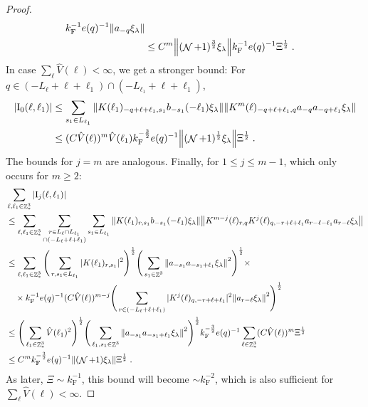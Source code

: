 \documentclass[12pt,a4paper]{article}
\numberwithin{equation}{section}
\newcommand{\1}{\mathbb{I}}
\newcommand{\F}{\mathrm{F}}
\newcommand{\I}{\mathrm{I}}
\DeclareMathOperator{\Z}{\mathbb{Z}}
\DeclareMathOperator{\NN}{\mathcal{N}}
\newcommand{\half}{\frac{1}{2}}
\theoremstyle{plain}
\theoremstyle{definition}
\theoremstyle{remark}
\theoremstyle{plain}
\theoremstyle{definition}
\theoremstyle{remark}
\begin{document}
\begin{proof}
{\begin{align}
		k_{\F}^{-1} e(q)^{-1}
		\norm{a_{-q} \xi_\lambda } \nonumber\\
	&\leq C^m \norm{(\NN+1)^{\frac 32} \xi_\lambda}
		k_{\F}^{-1} e(q)^{-1} \Xi^\half \;. \label{eq:estEQ2171_Coulomb}
\end{align}
In case $ \sum_\ell \hat{V}(\ell) < \infty $, we get a stronger bound: For $ q \in (-L_\ell + \ell + \ell_1) \cap (-L_{\ell_1} + \ell + \ell_1) $,}
\begin{align}
	|\I_0(\ell, \ell_1)|
	&\leq \sum\limits_{s_1 \in L_{\ell_1}}
		\norm{K(\ell_1)_{-q+\ell+\ell_1,s_1} b_{-s_1}(-\ell_1) \xi_\lambda}
		\norm{ K^m(\ell)_{-q+\ell+\ell_1,q}a_{-q}a_{-q+\ell_1} \xi_\lambda } \nonumber\\
	&\leq (C \hat{V}(\ell))^m
		\hat{V}(\ell_1)
		k_{\F}^{-\frac 32} e(q)^{-1}
		\norm{(\NN+1)^\half\xi_\lambda} \Xi^\half \;. \label{eq:estEQ2171}
\end{align}
The bounds for $ j = m $ are analogous. Finally, for $ 1 \le j \le m-1 $, which only occurs for $ m \ge 2 $:
\textcolor{green!30!black}{
\begin{align}
	&\sum_{\ell,\ell_1 \in \Z^3_*} |\I_j(\ell, \ell_1)| \nonumber\\
	&\leq \sum_{\ell,\ell_1 \in \Z^3_*} \sum\limits_{\substack{r\in L_{\ell} \cap L_{\ell_1} \\ \cap (-L_{\ell}+\ell+\ell_1)}} 
		\sum\limits_{s_1\in L_{\ell_1}} \norm{K(\ell_1)_{r,s_1} b_{-s_1}(-\ell_1) \xi_\lambda}\norm{ K^{m-j}(\ell)_{r,q} K^j(\ell)_{q,-r+\ell+\ell_1} a_{r-\ell-\ell_1} a_{r-\ell} \xi_\lambda } \nonumber\\
	&\leq \sum_{\ell,\ell_1 \in \Z^3_*} \Bigg( \sum\limits_{r,s_1\in L_{\ell_1}} 
		|K(\ell_1)_{r,s_1}|^2 \Bigg)^{\half}
		\Bigg( \sum\limits_{s_1 \in \Z^3}
		\norm{a_{-s_1} a_{-s_1+\ell_1} \xi_\lambda}^2 \Bigg)^{\half} \times \nonumber\\
		&\quad \times k_{\F}^{-1} e(q)^{-1} (C \hat{V}(\ell))^{m-j}
		\Bigg( \sum\limits_{r\in (-L_{\ell}+\ell+\ell_1)} 
		|K^j(\ell)_{q,-r+\ell+\ell_1}|^2
		\norm{ a_{r-\ell} \xi_\lambda }^2 \Bigg)^{\half} \nonumber\\
	&\leq  \Bigg( \sum_{\ell_1 \in \Z^3_*} 
		\hat{V}(\ell_1)^2 \Bigg)^{\half}
		\Bigg( \sum\limits_{\ell_1,s_1 \in \Z^3}
		\norm{a_{-s_1} a_{-s_1+\ell_1} \xi_\lambda}^2 \Bigg)^{\half}
		k_{\F}^{-\frac 32} e(q)^{-1} \sum_{\ell \in \Z^3_*} (C \hat{V}(\ell))^m \Xi^\half \nonumber\\
	&\leq C^m k_{\F}^{-\frac 32} e(q)^{-1}
		\norm{(\NN+1) \xi_\lambda} \Xi^{\half} \;. \label{eq:estEQ2172}
\end{align}
As later, $ \Xi \sim k_{\F}^{-1} $, this bound will become $ \sim k_{\F}^{-2} $, which is also sufficient for $ \sum_\ell \hat{V}(\ell) < \infty $.}
\end{proof}
\end{document}
